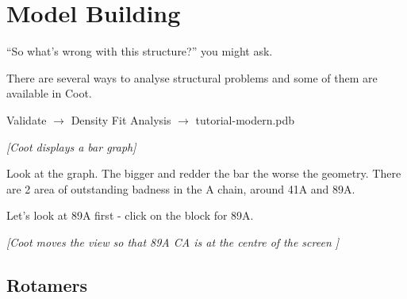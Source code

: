 \documentclass{article}
\begin{document}

\section{Model Building}

``So what's wrong with this structure?'' you might ask.

There are several ways to analyse structural problems and some of them
are available in Coot.

\begin{trivlist}
\item \textsf{Validate $\rightarrow$ Density Fit Analysis $\rightarrow$ tutorial-modern.pdb}

\textsl{ [Coot displays a bar graph]}

\item Look at the graph.  The bigger and redder the bar the worse the
  geometry. There are 2 area of outstanding badness in the A chain,
  around 41A and 89A.
\item Let's look at 89A first - click on the block for 89A.
\end{trivlist}

\textsl{ [Coot moves the view so that 89A CA is at the centre of the
  screen ]}

\subsection{Rotamers}
\end{document}
